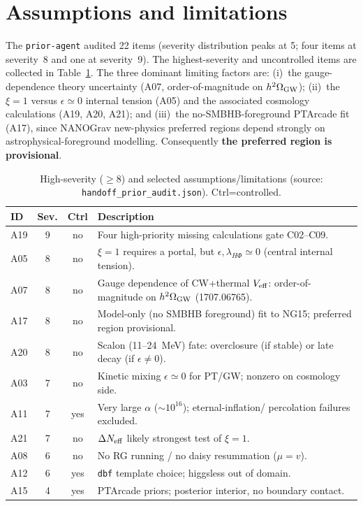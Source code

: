\documentclass[11pt]{article}
\newcommand{\Ombg}{h^2\Omega_{\rm GW}}
\begin{document}
\section{Assumptions and limitations}
\label{sec:assumptions}
The \texttt{prior-agent} audited 22 items (severity distribution peaks at 5;
four items at severity~8 and one at severity~9). The highest-severity and
uncontrolled items are collected in Table~\ref{tab:assumptions}. The three
dominant limiting factors are: (i)~the gauge-dependence theory uncertainty
(A07, order-of-magnitude on $\Ombg$); (ii)~the $\xi=1$ versus $\epsilon\simeq0$
internal tension (A05) and the associated cosmology calculations (A19, A20,
A21); and (iii)~the no-SMBHB-foreground PTArcade fit (A17), since NANOGrav
new-physics preferred regions depend strongly on astrophysical-foreground
modelling. Consequently \textbf{the preferred region is provisional}.

\begin{table}[ht]
\centering\small
\caption{High-severity ($\geq8$) and selected assumptions/limitations
(source: \texttt{handoff\_prior\_audit.json}). Ctrl=controlled.}
\label{tab:assumptions}
\begin{tabular}{l c c p{}}
\toprule
ID & Sev. & Ctrl & Description \\
\midrule
A19 & 9 & no & Four high-priority missing calculations gate C02--C09. \\
A05 & 8 & no & $\xi=1$ requires a portal, but $\epsilon,\lambda_{H\Phi}\simeq0$
(central internal tension). \\
A07 & 8 & no & Gauge dependence of CW+thermal $V_{\rm eff}$: order-of-magnitude
on $\Ombg$ (1707.06765). \\
A17 & 8 & no & Model-only (no SMBHB foreground) fit to NG15; preferred region
provisional. \\
A20 & 8 & no & Scalon (11--24~MeV) fate: overclosure (if stable) or late decay
(if $\epsilon\neq0$). \\
A03 & 7 & no & Kinetic mixing $\epsilon\simeq0$ for PT/GW; nonzero on cosmology
side. \\
A11 & 7 & yes & Very large $\alpha$ ($\sim10^{16}$); eternal-inflation/
percolation failures excluded. \\
A21 & 7 & no & $\Delta N_{\rm eff}$ likely strongest test of $\xi=1$. \\
A08 & 6 & no & No RG running / no daisy resummation ($\mu=v$). \\
A12 & 6 & yes & \texttt{dbf} template choice; higgsless out of domain. \\
A15 & 4 & yes & PTArcade priors; posterior interior, no boundary contact. \\
\bottomrule
\end{tabular}
\end{table}
\end{document}
